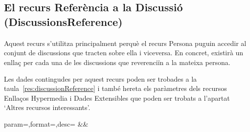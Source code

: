 \subsection{El recurs Referència a la Discussió (DiscussionsReference)}

    \paragraph{}
    Aquest recurs s'utilitza principalment perquè el recurs Persona puguin accedir al conjunt de discussions que tracten sobre ella i viceversa. En concret, existirà un enllaç per cada una de les discussions que reverenciïn a la mateixa persona.

    Les dades contingudes per aquest recurs poden ser trobades a la taula~\ref{res:discussionReference} i també hereta els paràmetres dels recursos Enllaços Hypermedia i Dades Extensibles que poden ser trobats a l'apartat `Altres recursos interessants'.

    \begin{center}
             {param=\param,format=\format,desc=\desc}
             {\param&\format&\desc}
     \end{center}
